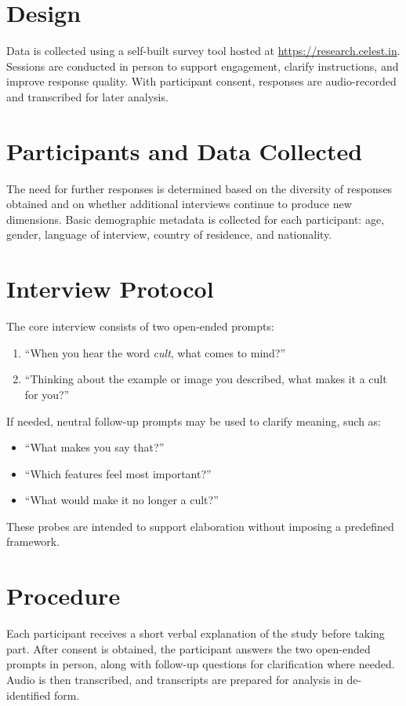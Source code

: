 \section{Design}
Data is collected using a self-built survey tool hosted at \url{https://research.celest.in}. Sessions are conducted in person to support engagement, clarify instructions, and improve response quality. With participant consent, responses are audio-recorded and transcribed for later analysis.

\section{Participants and Data Collected}
The need for further responses is determined based on the diversity of responses obtained and on whether additional interviews continue to produce new dimensions. Basic demographic metadata is collected for each participant: age, gender, language of interview, country of residence, and nationality.

\section{Interview Protocol}\label{sec:interview_protocol}
The core interview consists of two open-ended prompts:
\begin{enumerate}
	\item \enquote{When you hear the word \textit{cult}, what comes to mind?}
	\item \enquote{Thinking about the example or image you described, what makes it a cult for you?}
\end{enumerate}
If needed, neutral follow-up prompts may be used to clarify meaning, such as:
\begin{itemize}
	\item \enquote{What makes you say that?}
	\item \enquote{Which features feel most important?}
	\item \enquote{What would make it no longer a cult?}
\end{itemize}
These probes are intended to support elaboration without imposing a predefined framework.

\section{Procedure}
Each participant receives a short verbal explanation of the study before taking part. After consent is obtained, the participant answers the two open-ended prompts in person, along with follow-up questions for clarification where needed. Audio is then transcribed, and transcripts are prepared for analysis in de-identified form.


